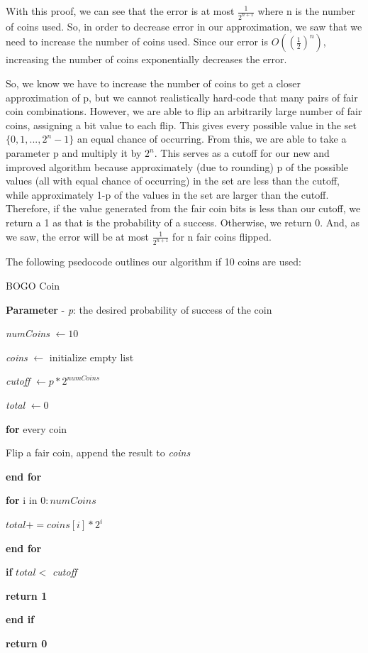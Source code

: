 \documentclass[11pt]{article}
\begin{document}
    With this proof, we can see that the error is at most $\frac{1}{2^{n+1}}$ where n is the number of coins used. So, 
    in order to decrease error in our approximation, we saw that we need to increase the number of coins used. Since our 
    error is $O((\frac{1}{2})^n)$, increasing the number of coins exponentially decreases the error. 
    
    So, we know we have 
    to increase the number of coins to get a closer approximation of p, but we cannot realistically hard-code that many pairs 
    of fair coin combinations. However, we are able to flip an arbitrarily large number of fair coins, assigning a bit value
    to each flip. This gives every possible value in the set $\{0, 1,..., 2^n-1\}$ an equal chance of occurring. From this, we
    are able to take a parameter p and multiply it by $2^n$. This serves as a cutoff for our new and improved algorithm because 
    approximately (due to rounding) p of the possible values (all with equal chance of occurring) in the set are less than the cutoff, 
    while approximately 1-p of the values in the set are larger than the cutoff. Therefore, if the value generated from the 
    fair coin bits is less than our cutoff, we return a 1 as that is the probability of a success. Otherwise, we return 0. 
    And, as we saw, the error will be at most $\frac{1}{2^{n+1}}$ for n fair coins flipped.

    The following psedocode outlines our algorithm if 10 coins are used:

    \begin{algorithm}
        \caption{BOGO Coin}
        \textbf{Parameter} - \textit{p}: the desired probability of success of the coin
        
        \vspace{4mm}
        \textit{numCoins} $\leftarrow 10$

        \textit{coins} $\leftarrow$ initialize empty list

        \textit{cutoff} $\leftarrow p * 2^{numCoins}$

        \textit{total} $\leftarrow 0$

        \textbf{for} every coin
        
        \hspace{3mm}
        Flip a fair coin, append the result to \textit{coins}

        \textbf{end for}

        \textbf{for} i in $0:numCoins$

        \hspace{3mm}
        $total += coins[i] * 2^i$

        \textbf{end for}

        \textbf{if} $total <$ \textit{cutoff}

        \hspace{3mm}
        \textbf{return 1}
        
        \textbf{end if}

        \textbf{return 0}
    \end{algorithm}
\end{document}
